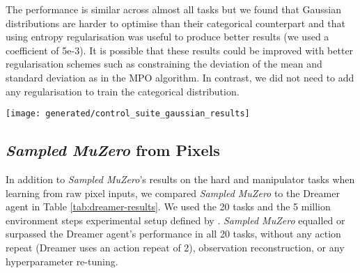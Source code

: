 \documentclass{article}
\newcommand{\smuzero}{\emph{Sampled MuZero}}
\begin{document}
The performance is similar across almost all tasks but we found that Gaussian distributions are harder to optimise than their categorical counterpart and  that using entropy regularisation was useful to produce better results (we used a coefficient of 5e-3). It is possible that these results could be improved with better regularisation schemes such as constraining the deviation of the mean and standard deviation as in the MPO \cite{mpo} algorithm. In contrast, we did not need to add any regularisation to train the categorical distribution.

\begin{figure*}
\texttt{[image: generated/control\_suite\_gaussian\_results]}
\vspace*{-7mm}
\caption[]{
\label{fig:control-suite-gaussian-results}
\textbf{Comparison between a Categorical and Gaussian parameterisation of the policy prediction for \smuzero{}.} Performance of \smuzero{} (3 seeds per experiment) throughout training on the DM Control Hard and Manipulator tasks.
}
\end{figure*}

\subsection{\smuzero{} from Pixels}
\label{dreamer}
In addition to \smuzero{}'s results on the hard and manipulator tasks when learning from raw pixel inputs, we compared \smuzero{} to the Dreamer agent \cite{hafner2019dream} in Table \ref{tab:dreamer-results}. We used the 20 tasks and the 5 million environment steps experimental setup defined by \cite{hafner2019dream}. \smuzero{} equalled or surpassed the Dreamer agent's performance in all 20 tasks, without any action repeat (Dreamer uses an action repeat of 2), observation reconstruction, or any hyperparameter re-tuning.
\end{document}
